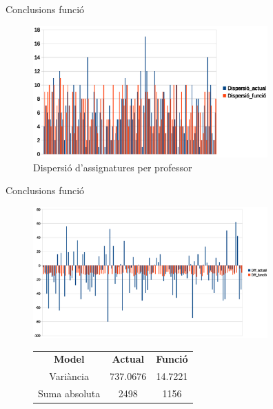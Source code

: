 \documentclass[twocolumn]{beamer}
\begin{document}
\begin{frame}{Conclusions funció}
\begin{figure}
	\includegraphics[width=9cm]{dispersio_diff}
	\caption{Dispersió d'assignatures per professor}
\end{figure}
\end{frame}

\begin{frame}{Conclusions funció}
\begin{figure}
	\includegraphics[width=9cm]{saldo_diff}
	\begin{tabular}{c|c|c}
		\textbf{Model} & \textbf{Actual} & \textbf{Funció} \\
		Variància & 737.0676 & 14.7221 \\
		Suma absoluta & 2498 & 1156 \\
	\end{tabular}
\end{figure}
\end{frame}
\end{document}
